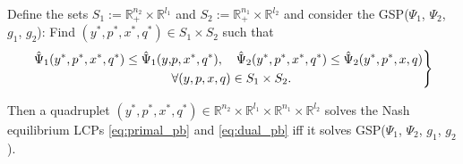 \documentclass[envcountsame]{llcns2e/llncs}
\begin{document}
\begin{theorem}
Define the sets $S_1 := \mathbb{R}^{n_2}_+ \times \mathbb{R}^{l_1}$ and $S_2 :=
\mathbb{R}^{n_1}_+ \times \mathbb{R}^{l_2}$ and consider the
GSP($\Psi_1$, $\Psi_2$, $g_1$, $g_2$): Find $(y^*,p^*, x^*, q^*) \in
S_1 \times S_2$ such that
\begin{eqnarray}
  \left.
  \begin{aligned}
    \hat{\Psi}_1(y^*, p^*, x^*, q^*) \le \hat{\Psi}_1(y, &p, x^*,
    q^*),\hspace{.5em} \hspace{.5em}\hat{\Psi}_2(y^*, p^*, x^*, q^*)
    \le \hat{\Psi}_2(y^*, p^*, x, q)\\
    &\forall (y,p, x, q) \in S_1 \times S_2.
  \end{aligned}
  \right\}
  \label{eq:unconstrained_pb}
\end{eqnarray}
\label{thm:pd}

Then a quadruplet $(y^*,p^*, x^*, q^*) \in \mathbb{R}^{n_2}
  \times \mathbb{R}^{l_1} \times \mathbb{R}^{n_1} \times
  \mathbb{R}^{l_2}$ solves the Nash equilibrium LCPs
  \eqref{eq:primal_pb} and \eqref{eq:dual_pb} iff it solves
  GSP($\Psi_1$, $\Psi_2$, $g_1$, $g_2$).
  \label{thm:pd}
\end{theorem}
\end{document}
